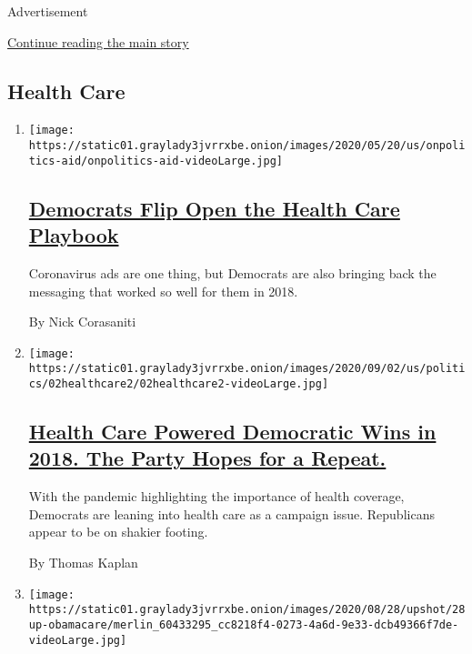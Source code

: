 Advertisement

\protect\hyperlink{after-mid3}{Continue reading the main story}

\hypertarget{health-care}{%
\subsection{Health Care}\label{health-care}}

\begin{enumerate}
\def\labelenumi{\arabic{enumi}.}
\item
  \texttt{[image: https://static01.graylady3jvrrxbe.onion/images/2020/05/20/us/onpolitics-aid/onpolitics-aid-videoLarge.jpg]}

  \hypertarget{democrats-flip-open-the-health-care-playbook}{%
  \subsection{\texorpdfstring{\href{/2020/09/08/us/politics/health-care-political-ads.html}{Democrats
  Flip Open the Health Care
  Playbook}}{Democrats Flip Open the Health Care Playbook}}\label{democrats-flip-open-the-health-care-playbook}}

  Coronavirus ads are one thing, but Democrats are also bringing back
  the messaging that worked so well for them in 2018.

  By Nick Corasaniti
\item
  \texttt{[image: https://static01.graylady3jvrrxbe.onion/images/2020/09/02/us/politics/02healthcare2/02healthcare2-videoLarge.jpg]}

  \hypertarget{health-care-powered-democratic-wins-in-2018-the-party-hopes-for-a-repeat}{%
  \subsection{\texorpdfstring{\href{/2020/09/02/us/politics/health-care-democrats-2020-election.html}{Health
  Care Powered Democratic Wins in 2018. The Party Hopes for a
  Repeat.}}{Health Care Powered Democratic Wins in 2018. The Party Hopes for a Repeat.}}\label{health-care-powered-democratic-wins-in-2018-the-party-hopes-for-a-repeat}}

  With the pandemic highlighting the importance of health coverage,
  Democrats are leaning into health care as a campaign issue.
  Republicans appear to be on shakier footing.

  By Thomas Kaplan
\item
  \texttt{[image: https://static01.graylady3jvrrxbe.onion/images/2020/08/28/upshot/28up-obamacare/merlin\_60433295\_cc8218f4-0273-4a6d-9e33-dcb49366f7de-videoLarge.jpg]}


\end{enumerate}
